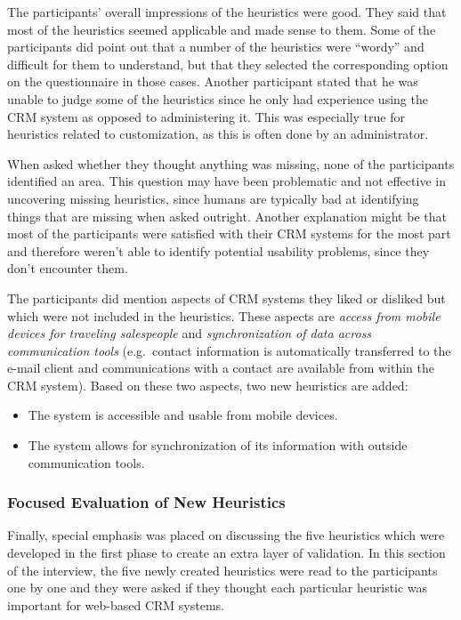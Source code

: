 The participants' overall impressions of the heuristics were good. They said that most of the heuristics seemed applicable and made sense to them. Some of the participants did point out that a number of the heuristics were ``wordy'' and difficult for them to understand, but that they selected the corresponding option on the questionnaire in those cases. Another participant stated that he was unable to judge some of the heuristics since he only had experience using the CRM system as opposed to administering it. This was especially true for heuristics related to customization, as this is often done by an administrator.

When asked whether they thought anything was missing, none of the participants identified an area. This question may have been problematic and not effective in uncovering missing heuristics, since humans are typically bad at identifying things that are missing when asked outright. Another explanation might be that most of the participants were satisfied with their CRM systems for the most part and therefore weren't able to identify potential usability problems, since they don't encounter them.

The participants did mention aspects of CRM systems they liked or disliked but which were not included in the heuristics. These aspects are \textit{access from mobile devices for traveling salespeople} and \textit{synchronization of data across communication tools} (e.g.\ contact information is automatically transferred to the e-mail client and communications with a contact are available from within the CRM system). Based on these two aspects, two new heuristics are added:
\begin{itemize}
	\item The system is accessible and usable from mobile devices.
	\item The system allows for synchronization of its information with outside communication tools.
\end{itemize}

\subsubsection{Focused Evaluation of New Heuristics}
Finally, special emphasis was placed on discussing the five heuristics which were developed in the first phase to create an extra layer of validation. In this section of the interview, the five newly created heuristics were read to the participants one by one and they were asked if they thought each particular heuristic was important for web-based CRM systems.

